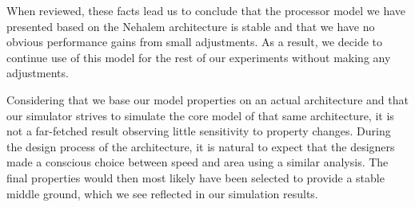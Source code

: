 When reviewed, these facts lead us to conclude that the processor model we have presented based on the Nehalem architecture is stable and that we have no obvious performance gains from small adjustments.
As a result, we decide to continue use of this model for the rest of our experiments without making any adjustments.

Considering that we base our model properties on an actual architecture and that our simulator strives to simulate the core model of that same architecture, it is not a far-fetched result observing little sensitivity to property changes.
During the design process of the architecture, it is natural to expect that the designers made a conscious choice between speed and area using a similar analysis.
The final properties would then most likely have been selected to provide a stable middle ground, which we see reflected in our simulation results.